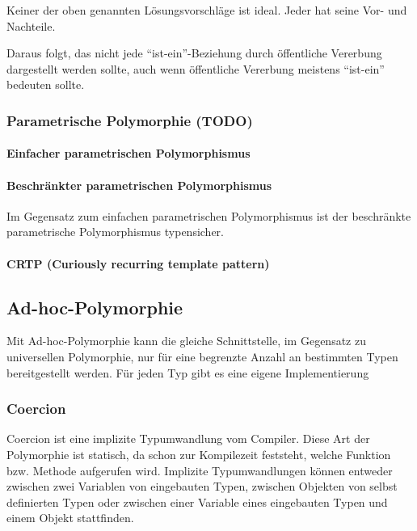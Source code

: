 					Keiner der oben genannten Lösungsvorschläge ist ideal. Jeder hat seine Vor- und Nachteile.
					
					Daraus folgt, das nicht jede ``ist-ein''-Beziehung durch öffentliche Vererbung dargestellt
					werden sollte, auch wenn öffentliche Vererbung meistens ``ist-ein'' bedeuten sollte.
			
		\subsubsection{Parametrische Polymorphie (TODO)}
			\paragraph{Einfacher parametrischen Polymorphismus}
			
			\paragraph{Beschränkter parametrischen Polymorphismus}
				Im Gegensatz zum einfachen parametrischen Polymorphismus ist der beschränkte parametrische Polymorphismus
				typensicher.
				
			\paragraph{CRTP (Curiously recurring template pattern)}
				
				
		
	\subsection{Ad-hoc-Polymorphie}
		Mit Ad-hoc-Polymorphie kann die gleiche Schnittstelle, im Gegensatz zu universellen Polymorphie, nur für eine
		begrenzte Anzahl an bestimmten Typen bereitgestellt werden. Für jeden Typ gibt es eine eigene Implementierung
	
		\subsubsection{Coercion}
			Coercion ist eine implizite Typumwandlung vom Compiler. Diese Art der Polymorphie ist statisch, da schon zur
			Kompilezeit feststeht, welche Funktion bzw. Methode aufgerufen wird. Implizite Typumwandlungen können entweder
			zwischen zwei Variablen von eingebauten Typen, zwischen Objekten von selbst definierten Typen oder zwischen
			einer Variable eines eingebauten Typen und einem Objekt stattfinden. 
			
